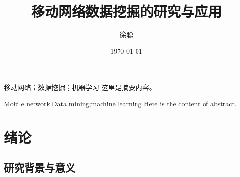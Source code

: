 \documentclass{HustGraduPaper}
\title{移动网络数据挖掘的研究与应用}
\author{徐聪}
\date{\today}
\begin{document}
    \maketitle
    \statement
    \clearpage

    \begin{cnabstract}{移动网络；数据挖掘；机器学习}
        这里是摘要内容。
    \end{cnabstract}
    \begin{enabstract}{Mobile network;Data mining;machine learning}
        Here is the content of abstract.
    \end{enabstract}

    \tableofcontents
    \clearpage

    \section{绪论}
    \subsection{研究背景与意义}
    
    
\end{document}
